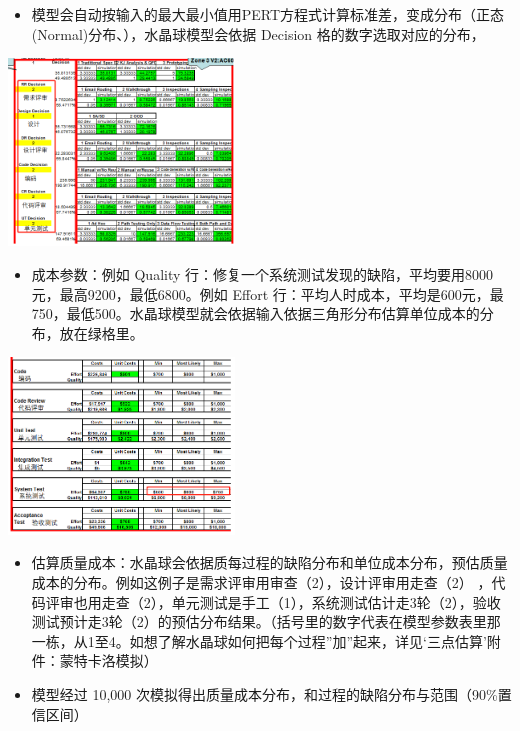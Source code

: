 \begin{itemize}
\tightlist
\item
  模型会自动按输入的最大最小值用PERT方程式计算标准差，变成分布（正态(Normal)分布、），水晶球模型会依据 Decision 格的数字选取对应的分布，

\end{itemize}

\includegraphics[width=6cm]{微信截图_20231027140307.png}

\begin{itemize}
\tightlist
\item
  成本参数：例如 Quality 行：修复一个系统测试发现的缺陷，平均要用8000元，最高9200，最低6800。例如 Effort 行：平均人时成本，平均是600元，最750，最低500。水晶球模型就会依据输入依据三角形分布估算单位成本的分布，放在绿格里。
\end{itemize}

\includegraphics[width=6cm]{微信截图_20231027140341.png}

\begin{itemize}
\tightlist
\item
  估算质量成本：水晶球会依据质每过程的缺陷分布和单位成本分布，预估质量成本的分布。例如这例子是需求评审用审查（2），设计评审用走查（2） ，代码评审也用走查（2），单元测试是手工（1），系统测试估计走3轮（2），验收测试预计走3轮（2）的预估分布结果。（括号里的数字代表在模型参数表里那一栋，从1至4。如想了解水晶球如何把每个过程”加”起来，详见‘三点估算’附件：蒙特卡洛模拟）
\end{itemize}

\begin{itemize}
\tightlist
\item
  模型经过 10,000 次模拟得出质量成本分布，和过程的缺陷分布与范围（90\%置信区间）
\end{itemize}

